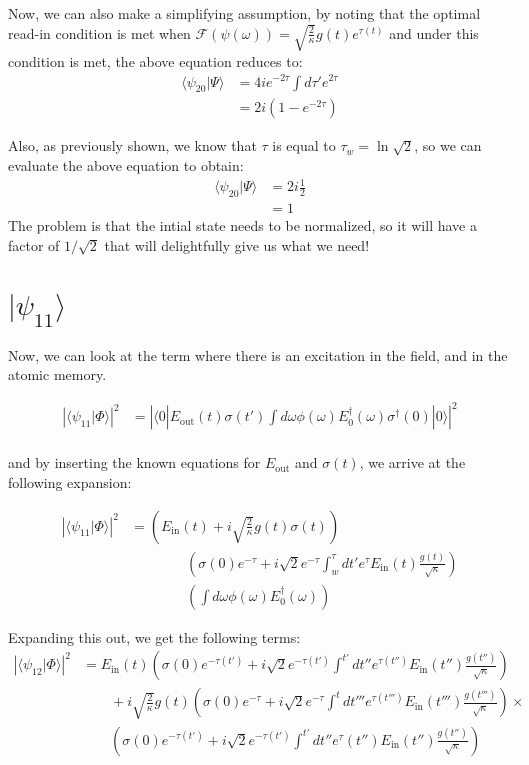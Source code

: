 \documentclass[12pt]{article}
\begin{document}
Now, we can also make a simplifying assumption, by noting that the optimal read-in condition is met when $\mathscr{F}(\psi(\omega)) = \sqrt{\frac{2}{\kappa}} g(t) e^{\tau(t)}$ and under this condition is met, the above equation reduces to:
\begin{align}
\langle \psi_{20}| \Psi \rangle & = 4 i e^{-2\tau} \int d \tau' e^{2 \tau} \\
& = 2 i\left(1- e^{-2\tau}\right)
\end{align}

Also, as previously shown, we know that $\tau$ is equal to $\tau_w = \ln{\sqrt{2}}$, so we can evaluate the above equation to obtain:
\begin{align}
\langle \psi_{20}| \Psi \rangle &= 2 i \frac{1}{2} \\
&= 1
\end{align}
The problem is that the intial state needs to be normalized, so it will have
a factor of $1/\sqrt{2}$ that will delightfully give us what we need!
\section{$| \psi_{11} \rangle$}
Now, we can look at the term where there is an excitation in the field, and in the atomic memory.

\begin{align}
\left | \langle \psi_{11} | \Phi \rangle \right | ^2 &= \left | \langle 0 | E_\textrm{out}(t) \sigma(t') \int d \omega \phi(\omega)E^\dagger_0(\omega)
\sigma^\dagger(0) | 0 \rangle \right |^2 \\
\end{align}

and by inserting the known equations for $E_\textrm{out}$ and $\sigma(t)$, we arrive at the following expansion:

\begin{align}
\left | \langle \psi_{11} | \Phi \rangle \right | ^2 &= 
   \left(  E_\textrm{in}(t) + i \sqrt{\frac{2}{\kappa}} g(t) \sigma(t) \right )\\
   & \qquad \qquad \left (\sigma(0) e^{-\tau} + i\sqrt{2} e^{-\tau} \int^\tau_w d t' e^\tau E_\textrm{in}(t) \frac{g(t)}{\sqrt{\kappa}}\right)\\
   &\qquad \qquad \left(\int d \omega \phi(\omega)E^\dagger_0(\omega) \right )
\end{align}

Expanding this out, we get the following terms:
\begin{align}
\left | \langle \psi_{12} | \Phi \rangle \right | ^2 &= 
E_\textrm{in}(t) \left( \sigma(0) e^{-\tau(t')} + i\sqrt{2} e^{-\tau(t')} \int^{t'} d t'' e^{\tau(t'')} E_\textrm{in}(t'') \frac{g(t'')}{\sqrt{\kappa}} \right ) \\
&\qquad+ i \sqrt{\frac{2}{\kappa}}g(t)\left (\sigma(0) e^{-\tau} + i\sqrt{2} e^{-\tau} \int^{t}d t''' e^{\tau(t''')} E_\textrm{in}(t''') \frac{g(t''')}{\sqrt{\kappa}} \right) \times\\
&\qquad \left(\sigma(0) e^{-\tau(t')} + i\sqrt{2} e^{-\tau(t')} \int^{t'} d t'' e^\tau(t'') E_\textrm{in}(t'') \frac{g(t'')}{\sqrt{\kappa}}\right) 
\end{align}
\end{document}
